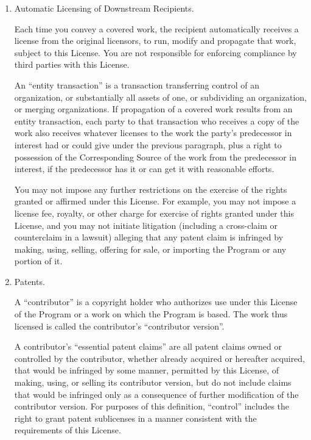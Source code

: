 \documentclass[10pt,a4paper,ngerman,titlepage,tocindentauto]{article}
\begin{document}
\begin{multicols}{3}
{\begin{enumerate}
					\item Automatic Licensing of Downstream Recipients.

					Each time you convey a covered work, the recipient automatically
					receives a license from the original licensors, to run, modify and
					propagate that work, subject to this License.  You are not responsible
					for enforcing compliance by third parties with this License.

					An ``entity transaction'' is a transaction transferring control of an
					organization, or substantially all assets of one, or subdividing an
					organization, or merging organizations.  If propagation of a covered
					work results from an entity transaction, each party to that
					transaction who receives a copy of the work also receives whatever
					licenses to the work the party's predecessor in interest had or could
					give under the previous paragraph, plus a right to possession of the
					Corresponding Source of the work from the predecessor in interest, if
					the predecessor has it or can get it with reasonable efforts.

					You may not impose any further restrictions on the exercise of the
					rights granted or affirmed under this License.  For example, you may
					not impose a license fee, royalty, or other charge for exercise of
					rights granted under this License, and you may not initiate litigation
					(including a cross-claim or counterclaim in a lawsuit) alleging that
					any patent claim is infringed by making, using, selling, offering for
					sale, or importing the Program or any portion of it.

					\item Patents.

					A ``contributor'' is a copyright holder who authorizes use under this
					License of the Program or a work on which the Program is based.  The
					work thus licensed is called the contributor's ``contributor version''.

					A contributor's ``essential patent claims'' are all patent claims
					owned or controlled by the contributor, whether already acquired or
					hereafter acquired, that would be infringed by some manner, permitted
					by this License, of making, using, or selling its contributor version,
					but do not include claims that would be infringed only as a
					consequence of further modification of the contributor version.  For
					purposes of this definition, ``control'' includes the right to grant
					patent sublicenses in a manner consistent with the requirements of
					this License.


\end{enumerate}}
\end{multicols}
\end{document}
